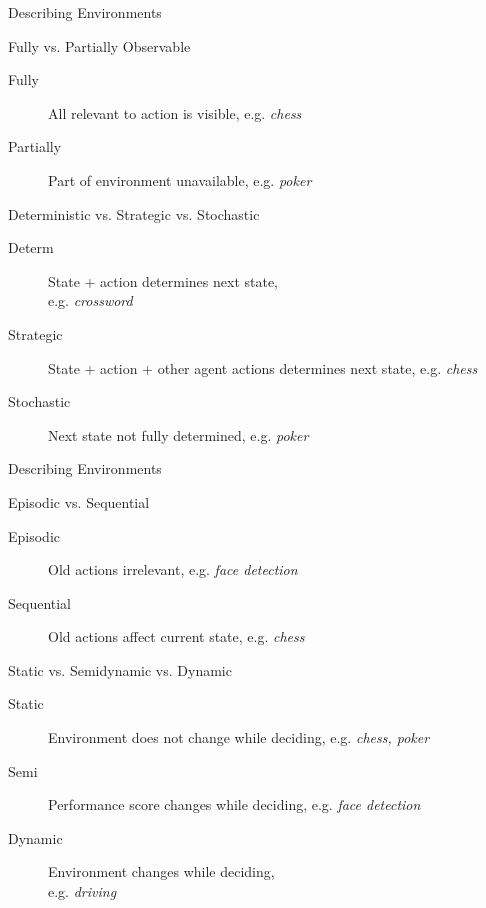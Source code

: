 \documentclass[12pt]{beamer}
\begin{document}
\begin{frame}{Describing Environments}
	\begin{block}{Fully vs. Partially Observable}
		\begin{description}
			\item[Fully] All relevant to action is visible, e.g. \textit{chess}
			\item[Partially] Part of environment unavailable, e.g. \textit{poker}
		\end{description}
	\end{block}
	\begin{block}{Deterministic vs. Strategic vs. Stochastic}
		\begin{description}
			\item[Determ] State + action determines next state, \\ e.g. \textit{crossword}
			\item[Strategic] State + action + other agent actions determines next state, e.g. \textit{chess}
			\item[Stochastic] Next state not fully determined, e.g. \textit{poker}
		\end{description}
	\end{block}
\end{frame}
\begin{frame}{Describing Environments}
	\begin{block}{Episodic vs. Sequential}
		\begin{description}
			\item[Episodic] Old actions irrelevant, e.g. \textit{face detection}
			\item[Sequential] Old actions affect current state, e.g. \textit{chess}
		\end{description}
	\end{block}
	\begin{block}{Static vs. Semidynamic vs. Dynamic}
		\begin{description}
			\item[Static] Environment does not change while deciding, e.g. \textit{chess, poker}
			\item[Semi] Performance score changes while deciding, e.g. \textit{face detection}
			\item[Dynamic] Environment changes while deciding, \\ e.g. \textit{driving}
		\end{description}
	\end{block}
\end{frame}
\end{document}
